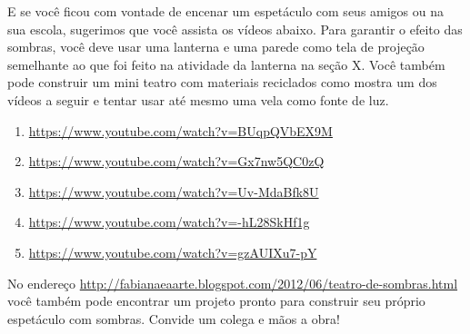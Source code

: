 
E se você ficou com vontade de encenar um espetáculo com seus amigos ou na sua escola, sugerimos que você assista os vídeos abaixo. Para garantir o efeito das sombras, você deve usar uma lanterna e uma parede como tela de projeção semelhante ao que foi feito na atividade da lanterna na seção X. Você também pode construir um mini teatro com materiais reciclados como mostra um dos vídeos a seguir e tentar usar até mesmo uma vela como fonte de luz.
\begin{enumerate}
\item {} 
\url{https://www.youtube.com/watch?v=BUqpQVbEX9M}

\item {} 
\url{https://www.youtube.com/watch?v=Gx7nw5QC0zQ}

\item {} 
\url{https://www.youtube.com/watch?v=Uv-MdaBfk8U}

\item {} 
\url{https://www.youtube.com/watch?v=-hL28SkHf1g}

\item {} 
\url{https://www.youtube.com/watch?v=gzAUIXu7-pY}

\end{enumerate}



No endereço \url{http://fabianaeaarte.blogspot.com/2012/06/teatro-de-sombras.html} você também pode encontrar um projeto pronto para construir seu próprio espetáculo com sombras. Convide um colega e mãos a obra!


\exercise
\label{\detokenize{GE301-E:exercicios}}\label{\detokenize{GE301-E::doc}}

